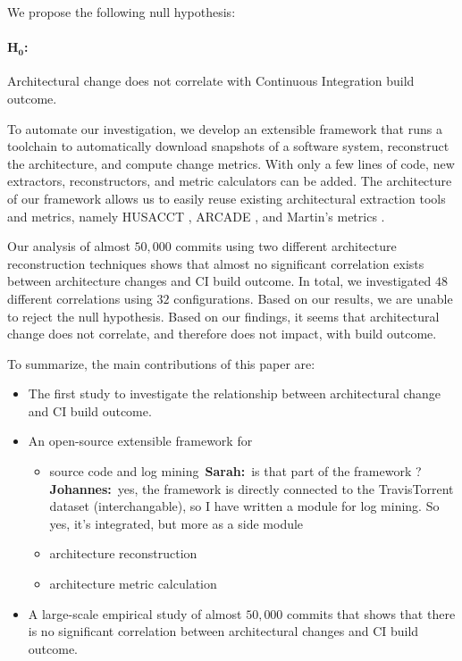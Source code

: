 \documentclass[sigplan, anonymous, review]{acmart}
\newcommand{\sn}[1]{{\color{blue}\textbf{Sarah:}~#1}}
\newcommand{\jk}[1]{{\color{violet}\textbf{Johannes:}~#1}}
\begin{document}
We propose the following null hypothesis:

\paragraph{$\mathbf{H_0}$:} Architectural change does not correlate with Continuous Integration build outcome. 
\vspace{0.2cm}

To automate our investigation, we develop an extensible framework that runs a toolchain to automatically download snapshots of a software system, reconstruct the architecture, and compute change metrics. With only a few lines of code, new extractors, reconstructors, and metric calculators can be added. 
The architecture of our framework allows us to easily reuse existing architectural extraction tools and metrics, namely HUSACCT \cite{Husacct1}, ARCADE \cite{Arcade}, and Martin's metrics \cite{martinsMetrics}.

Our analysis of almost $50,000$ commits using two different architecture reconstruction techniques shows that almost no significant correlation exists between architecture changes and CI build outcome. In total, we investigated $48$ different correlations using $32$ configurations. Based on our results, we are unable to reject the null hypothesis. Based on our findings, it seems that architectural change does not correlate, and therefore does not impact, with build outcome.

To summarize, the main contributions of this paper are:
\begin{itemize}
\item The first study to investigate the relationship between architectural change and CI build outcome.
\item An open-source extensible framework for 
\begin{itemize}
	\item source code and log mining~\sn{is that part of the framework ?} \jk{yes, the framework is directly connected to the TravisTorrent dataset (interchangable), so I have written a module for log mining. So yes, it's integrated, but more as a side module}
	\item architecture reconstruction
	\item architecture metric calculation
\end{itemize}
\item A large-scale empirical study of almost $50,000$ commits that shows that there is no significant correlation between architectural changes and CI build outcome.
\end{itemize}
\end{document}
